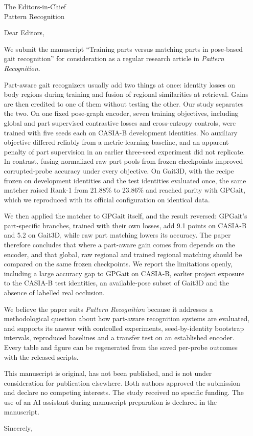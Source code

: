 \documentclass[11pt]{letter}
\date{\today}
\begin{document}
\begin{letter}{The Editors-in-Chief\\Pattern Recognition}
\opening{Dear Editors,}

We submit the manuscript ``Training parts versus matching parts in pose-based
gait recognition'' for
consideration as a regular research article in \emph{Pattern Recognition}.

Part-aware gait recognizers usually add two things at once: identity losses on
body regions during training and fusion of regional similarities at
retrieval. Gains are then credited to one of them without testing the other.
Our study separates the two. On one fixed pose-graph encoder, seven training
objectives, including global and part supervised contrastive losses and
cross-entropy controls, were trained with five seeds each on CASIA-B
development identities. No auxiliary objective differed reliably from a
metric-learning baseline, and an apparent penalty of part supervision in an
earlier three-seed experiment did not replicate. In contrast, fusing normalized
raw part pools from frozen checkpoints improved corrupted-probe accuracy under
every objective. On Gait3D, with the recipe frozen on development identities
and the test identities evaluated once, the same matcher raised Rank-1 from
21.88\% to 23.86\% and reached parity with GPGait, which we reproduced with its
official configuration on identical data.

We then applied the matcher to GPGait itself, and the result reversed: GPGait's
part-specific branches, trained with their own losses, add 9.1 points on
CASIA-B and 5.2 on Gait3D, while raw part matching lowers its accuracy. The
paper therefore concludes that where a part-aware gain comes from depends on
the encoder, and that global, raw regional and trained regional matching should
be compared on the same frozen checkpoints. We report the limitations openly,
including a large accuracy gap to GPGait on CASIA-B, earlier project exposure to
the CASIA-B test identities, an available-pose subset of Gait3D and the absence
of labelled real occlusion.

We believe the paper suits \emph{Pattern Recognition} because it addresses a
methodological question about how part-aware recognition systems are evaluated,
and supports its answer with controlled experiments, seed-by-identity bootstrap
intervals, reproduced baselines and a transfer test on an established
encoder. Every table and
figure can be regenerated from the saved per-probe outcomes with the released
scripts.

This manuscript is original, has not been published, and is not under
consideration for publication elsewhere. Both authors approved the submission
and declare no competing interests. The study received no specific funding.
The use of an AI assistant during manuscript preparation is declared in the
manuscript.

\closing{Sincerely,}
\end{letter}
\end{document}
